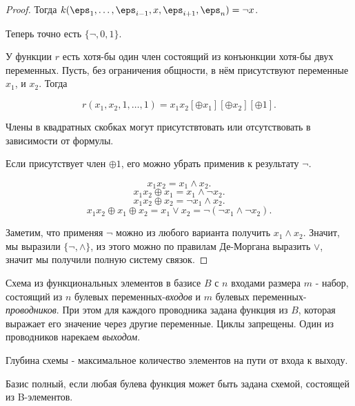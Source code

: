 \begin{theorem}
\begin{proof}
        Тогда $k(\eps_1, \ldots, \eps_{i-1}, x, \eps_{i+1}, \eps_{n}) = \neg x$.

        Теперь точно есть $\{\neg, 0, 1\} $.

        У функции $r$ есть хотя-бы один член состоящий из конъюнкции хотя-бы двух переменных. Пусть, без ограничения общности, в нём присутствуют переменные $x_1$, и $x_2$. Тогда

        \[ r(x_1, x_2, 1, \ldots, 1) = x_1x_2[\oplus x_1][\oplus x_2][\oplus 1] .\]

        Члены в квадратных скобках могут присутствтовать или отсутствовать в зависимости от формулы.

        Если присутствует член $\oplus 1$, его можно убрать применив к результату $\neg$.

        \[ x_1x_2 = x_1 \land x_2 .\]
        \[ x_1x_2\oplus x_1 = x_1 \land \neg x_2 .\] 
        \[ x_1x_2\oplus x_2 = \neg x_1 \land x_2 .\] 
        \[ x_1x_2\oplus x_1\oplus x_2 = x_1 \lor x_2 = \neg \left( \neg x_1 \land \neg x_2 \right)  .\]

        Заметим, что применяя $\neg$ можно из любого варианта получить $x_1 \land x_2$. Значит, мы выразили $\{\neg, \land\}$, из этого можно по правилам Де-Моргана выразить $\lor$, значит мы получили полную систему связок. 
    \end{proof}
\end{theorem}

\begin{definition} \thmslashn
	
	Схема из функциональных элементов в базисе $B$  с $n$ входами размера $m$ - набор, состоящий из 
	$n$ булевых переменных-\textit{входов} и 
	$m$ булевых переменных-\textit{проводников}. 
	При этом для каждого проводника задана функция из $B$, 
	которая выражает его значение через другие переменные. 
	Циклы запрещены. 
	Один из проводников нарекаем \textit{выходом}.
\end{definition}
\begin{definition} \thmslashn

	Глубина схемы - максимальное количество элементов на пути от входа к выходу.
\end{definition}
\begin{definition} \thmslashn

	Базис полный, если любая булева функция может быть задана схемой, состоящей из B-элементов.
\end{definition}

